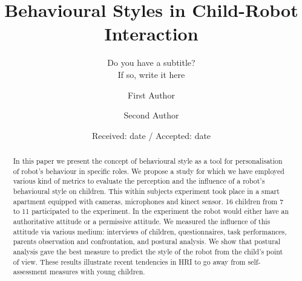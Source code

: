 \documentclass[smallextended]{svjour3}
\begin{document}
\title{Behavioural Styles in Child-Robot Interaction%
}
\subtitle{Do you have a subtitle?\\ If so, write it here}


\author{First Author         \and
        Second Author %
}



\date{Received: date / Accepted: date}
\maketitle
\begin{abstract}
	In this paper we present the concept of behavioural style as a tool for personalisation of robot's behaviour in specific roles. 
	We propose a study for which we have employed various kind of metrics to evaluate the perception and the influence of a robot's behavioural style on children. 
	This within subjects experiment took place in a smart apartment equipped with cameras, microphones and kinect sensor. 16 children from 7 to 11 participated to the experiment.
	In the experiment the robot would either have an authoritative attitude or a permissive attitude. 
	We measured the influence of this attitude via various medium:
	interviews of children, questionnaires, task performances, parents observation and confrontation, and postural analysis. 
	We show that postural analysis gave the best measure to predict the style of the robot from the child's point of view.
	These results illustrate recent tendencies in HRI to go away from self-assessment measures with young children.
\end{abstract}
\end{document}
